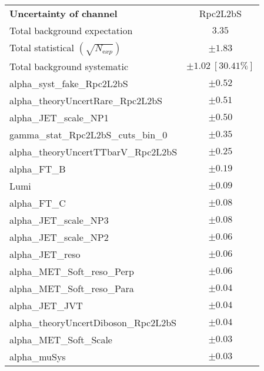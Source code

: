 
\begin{table}
\begin{center}
\setlength{\tabcolsep}{0.0pc}
\begin{tabular*}{\textwidth}{@{\extracolsep{\fill}}lc}
\noalign{\smallskip}\hline\noalign{\smallskip}
{\bfseries Uncertainty of channel}                                    & Rpc2L2bS            \\
\noalign{\smallskip}\hline\noalign{\smallskip}
Total background expectation             &  $3.35$       \\
\noalign{\smallskip}\hline\noalign{\smallskip}
Total statistical $(\sqrt{N_{\mathrm exp}})$              & $\pm 1.83$       \\
Total background systematic               & $\pm 1.02\ [30.41\%] $             \\
\noalign{\smallskip}\hline\noalign{\smallskip}
\noalign{\smallskip}\hline\noalign{\smallskip}
alpha\_syst\_fake\_Rpc2L2bS         & $\pm 0.52$       \\
alpha\_theoryUncertRare\_Rpc2L2bS         & $\pm 0.51$       \\
alpha\_JET\_scale\_NP1         & $\pm 0.50$       \\
gamma\_stat\_Rpc2L2bS\_cuts\_bin\_0         & $\pm 0.35$       \\
alpha\_theoryUncertTTbarV\_Rpc2L2bS         & $\pm 0.25$       \\
alpha\_FT\_B         & $\pm 0.19$       \\
Lumi         & $\pm 0.09$       \\
alpha\_FT\_C         & $\pm 0.08$       \\
alpha\_JET\_scale\_NP3         & $\pm 0.08$       \\
alpha\_JET\_scale\_NP2         & $\pm 0.06$       \\
alpha\_JET\_reso         & $\pm 0.06$       \\
alpha\_MET\_Soft\_reso\_Perp         & $\pm 0.06$       \\
alpha\_MET\_Soft\_reso\_Para         & $\pm 0.04$       \\
alpha\_JET\_JVT         & $\pm 0.04$       \\
alpha\_theoryUncertDiboson\_Rpc2L2bS         & $\pm 0.04$       \\
alpha\_MET\_Soft\_Scale         & $\pm 0.03$       \\
alpha\_muSys         & $\pm 0.03$       \\

\end{tabular*}
\end{center}
\end{table}
